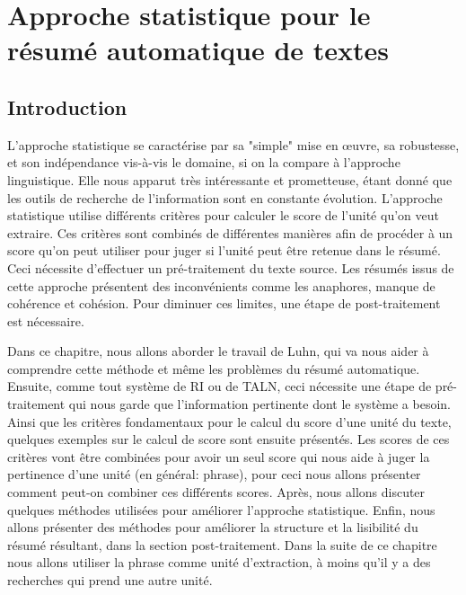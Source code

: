 \documentclass[a4paper,12pt,oneside]{../use/ESIthesis}
\begin{document}
  	 	
  	 	\dominitoc 
  	 	\mainmatter
  \fi

\chapter{Approche statistique pour le résumé automatique de textes}
\label{chap:RATstat}
\minitoc

\section{Introduction}

L'approche statistique se caractérise par sa "simple" mise en œuvre, sa robustesse, et son indépendance vis-à-vis le domaine, si on la compare à l'approche linguistique. 
Elle nous apparut très intéressante et prometteuse, étant donné que les outils de recherche de l'information sont en constante évolution. 
L'approche statistique utilise différents critères pour calculer le score de l'unité qu'on veut extraire. 
Ces critères sont combinés de différentes manières afin de procéder à un score qu'on peut utiliser pour juger si l'unité peut être retenue dans le résumé. 
Ceci nécessite d'effectuer un pré-traitement du texte source.
Les résumés issus de cette approche présentent des inconvénients comme les anaphores, manque de cohérence et cohésion.
Pour diminuer ces limites, une étape de post-traitement est nécessaire. 

Dans ce chapitre, nous allons aborder le travail de Luhn, qui va nous aider à comprendre cette méthode et même les problèmes du résumé automatique. 
Ensuite, comme tout système de RI ou de TALN, ceci nécessite une étape de pré-traitement qui nous garde que l'information pertinente dont le système a besoin. 
Ainsi que les critères fondamentaux pour le calcul du score d'une unité du texte, quelques exemples sur le calcul de score sont ensuite présentés. 
Les scores de ces critères vont être combinées pour avoir un seul score qui nous aide à juger la pertinence d'une unité (en général: phrase), pour ceci nous allons présenter comment peut-on combiner ces différents scores. 
Après, nous allons discuter quelques méthodes utilisées pour améliorer l'approche statistique. 
Enfin, nous allons présenter des méthodes pour améliorer la structure et la lisibilité du résumé résultant, dans la section post-traitement. 
Dans la suite de ce chapitre nous allons utiliser la phrase comme unité d'extraction, à moins qu'il y a des recherches qui prend une autre unité.
\end{document}
